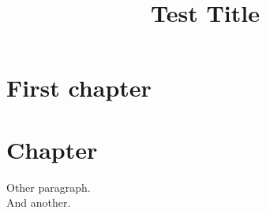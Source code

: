 \documentclass{sffms}
\title{Test Title}
\begin{document}
\chapter{First chapter}



\chapter*{Chapter}

Other paragraph.\\
And another.
\end{document}
